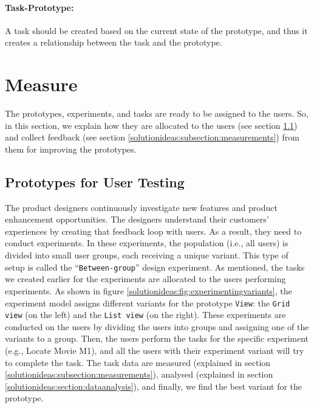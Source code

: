 \paragraph{Task-Prototype:} A task should be created based on the current state of the prototype, and thus it creates a relationship between the task and the prototype.


\section{Measure}
\label{solutionideas:section:measure}
The prototypes, experiments, and tasks are ready to be assigned to the users. 
So, in this section, we explain how they are allocated to the users (see section \ref{solutionideas:subsection:usertesting}) and collect feedback (see section \ref{solutionideas:subsection:measurements}) from them for improving the prototypes.

\subsection{Prototypes for User Testing}
\label{solutionideas:subsection:usertesting}

The product designers continuously investigate new features and product enhancement opportunities. 
The designers understand their customers' experiences by creating that feedback loop with users. 
As a result, they need to conduct experiments.
In these experiments, the population (i.e., all users) is divided into small user groups, each receiving a unique variant. 
This type of setup is called the ``\texttt{Between-group}'' design experiment. 
As mentioned, the tasks we created earlier for the experiments are allocated to the users performing experiments.
As shown in figure \ref{solutionideas:fig:experimentingvariants}, the experiment model assigns different variants for the prototype \texttt{View}: the \texttt{Grid view} (on the left) and the \texttt{List view} (on the right). 
These experiments are conducted on the users by dividing the users into groups and assigning one of the variants to a group. 
Then, the users perform the tasks for the specific experiment (e.g., Locate Movie M1), and all the users with their experiment variant will try to complete the task.
The task data are measured (explained in section \ref{solutionideas:subsection:measurements}), analysed (explained in section \ref{solutionideas:section:dataanalysis}), and finally, we find the best variant for the prototype.

